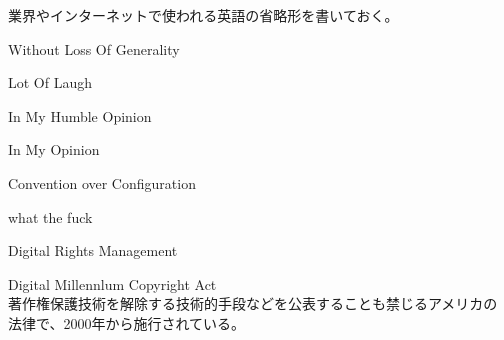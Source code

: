 	業界やインターネットで使われる英語の省略形を書いておく。
	\begin{description}\setlength{\itemsep}{-1mm} %
		\item[WOLOG] Without Loss Of Generality
		\item[LOL] Lot Of Laugh
		\item[IMHO] In My Humble Opinion
		\item[IMO] In My Opinion
		\item[CoC] Convention over Configuration
		\item[WTF] what the fuck
		\item[DRM] Digital Rights Management
		\item[DMCA] Digital Millennlum Copyright Act \\
		著作権保護技術を解除する技術的手段などを公表することも禁じるアメリカの
		法律で、2000年から施行されている。
	\end{description} %
